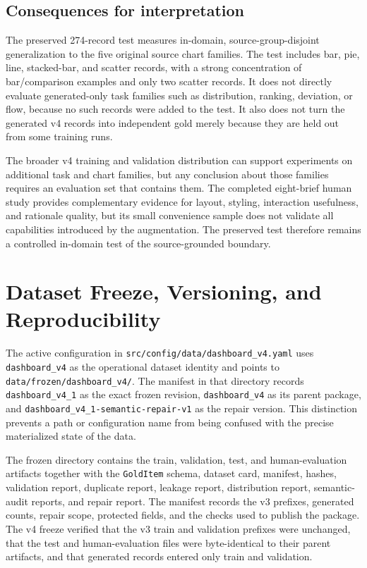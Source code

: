 \subsection{Consequences for interpretation}

The preserved 274-record test measures in-domain, source-group-disjoint generalization to the five original source chart families. The test includes bar, pie, line, stacked-bar, and scatter records, with a strong concentration of bar/comparison examples and only two scatter records. It does not directly evaluate generated-only task families such as distribution, ranking, deviation, or flow, because no such records were added to the test. It also does not turn the generated v4 records into independent gold merely because they are held out from some training runs.

The broader v4 training and validation distribution can support experiments on additional task and chart families, but any conclusion about those families requires an evaluation set that contains them. The completed eight-brief human study provides complementary evidence for layout, styling, interaction usefulness, and rationale quality, but its small convenience sample does not validate all capabilities introduced by the augmentation. The preserved test therefore remains a controlled in-domain test of the source-grounded boundary.

\section{Dataset Freeze, Versioning, and Reproducibility}

The active configuration in \nolinkurl{src/config/data/dashboard_v4.yaml} uses \texttt{dashboard\_v4} as the operational dataset identity and points to \nolinkurl{data/frozen/dashboard_v4/}. The manifest in that directory records \texttt{dashboard\_v4\_1} as the exact frozen revision, \texttt{dashboard\_v4} as its parent package, and \texttt{dashboard\_v4\_1-semantic-\allowbreak repair-v1} as the repair version. This distinction prevents a path or configuration name from being confused with the precise materialized state of the data.

The frozen directory contains the train, validation, test, and human-evaluation artifacts together with the \texttt{GoldItem} schema, dataset card, manifest, hashes, validation report, duplicate report, leakage report, distribution report, semantic-audit reports, and repair report. The manifest records the v3 prefixes, generated counts, repair scope, protected fields, and the checks used to publish the package. The v4 freeze verified that the v3 train and validation prefixes were unchanged, that the test and human-evaluation files were byte-identical to their parent artifacts, and that generated records entered only train and validation.

